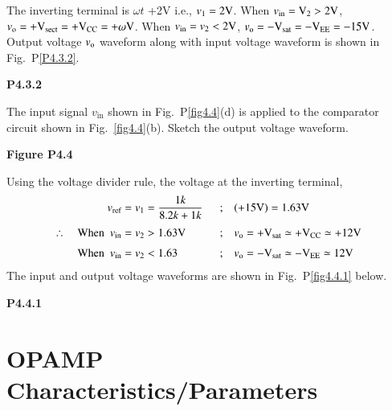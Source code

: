 \begin{solution}
The inverting terminal is $\omega t$ +2V i.e., $v_{1}=2\textrm{V}$. When $v_{\text{in}}=\textrm{V}_{2}>2\textrm{V}$, $v_{\textrm{o}}=+\textrm{V}_{\text{sect}}=+\textrm{V}_{\text{CC}}=+\omega \textrm{V}$. When $v_{\text{in}}=v_{2}<2\textrm{V}$, $v_{\textrm{o}}=-\textrm{V}_{\text{sat}}=-\textrm{V}_{\text{EE}}=-15\textrm{V}$. Output voltage $v_{\textrm{o}}$ waveform along with input voltage waveform is shown in Fig.~P\ref{P4.3.2}.
\begin{center}
{\bf P4.3.2}
\end{center}
\end{solution}

\begin{problem}\label{prob4.4}
The input signal $v_{\text{in}}$ shown in Fig.~P\ref{fig4.4}(d) is applied to the comparator circuit shown in Fig.~\ref{fig4.4}(b). Sketch the output voltage waveform.
\begin{center}
{\bf Figure P4.4}
\end{center}
\end{problem}

\begin{solution}
Using the voltage divider rule, the voltage at the inverting terminal,
\begin{alignat*}{2}
 v_{\text{ref}} &=v_{1}=\frac{1k}{8.2 k +1k}~~ &;&\quad (+15\textrm{V})=1.63\textrm{V}\\[3pt]
\therefore\quad \text{When~ } v_{\text{in}} &= v_{2}>1.63\textrm{V} &;&\quad v_{\textrm{o}}=+\textrm{V}_{\text{sat}}\simeq +\textrm{V}_{\text{CC}}\simeq + 12\textrm{V}\\[3pt]
\text{When~ } v_{\text{in}} &=v_{2}<1.63 &;&\quad v_{\textrm{o}}=-\textrm{V}_{\text{sat}}\simeq -\textrm{V}_{\text{EE}}\simeq 12\textrm{V}
\end{alignat*}
The input and output voltage waveforms are shown in Fig.~P\ref{fig4.4.1} below.
\begin{center}
{\bf P4.4.1}
\end{center}
\end{solution}

\section{OPAMP Characteristics/Parameters}\label{fig4.3}

